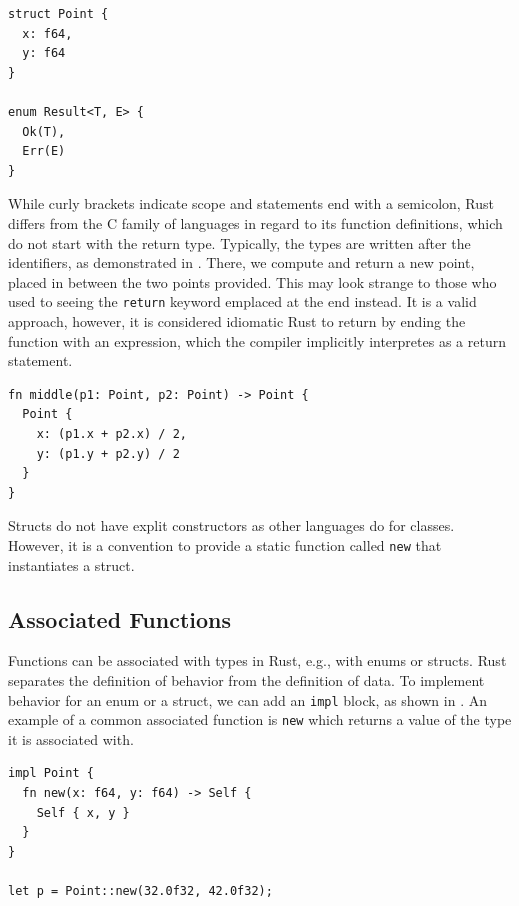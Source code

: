 \documentclass[paper=a4,%
  twoside,%
  BCOR4mm,%
  abstract=true,%
  toc=bibliography,%
  chapterprefix=true,%
  toc=bibliographynumbered,%
  open=right,%
  english,%
  pagesize=pdftex]{scrreprt}
\begin{document}
\begin{lstlisting}[style=boxed, caption={The type definition for a point in two-dimensional space and an enum definition}, label=lst:example-struct-enum]
struct Point {
  x: f64,
  y: f64
}

enum Result<T, E> {
  Ok(T),
  Err(E)
}
\end{lstlisting}

While curly brackets indicate scope and statements end with a semicolon, Rust differs from the C family of languages in regard to its function definitions, which do not start with the return type. Typically, the types are written after the identifiers, as demonstrated in . There, we compute and return a new point, placed in between the two points provided. This may look strange to those who used to seeing the \texttt{return} keyword emplaced at the end instead. It is a valid approach, however, it is considered idiomatic Rust to return by ending the function with an expression, which the compiler implicitly interpretes as a return statement.

\begin{lstlisting}[style=boxed, caption={A function to compute the point between two points in two-dimensional space}, label=lst:example-functions-struct-enum]
fn middle(p1: Point, p2: Point) -> Point {
  Point {
    x: (p1.x + p2.x) / 2,
    y: (p1.y + p2.y) / 2
  }
}
\end{lstlisting}

Structs do not have explit constructors as other languages do for classes. However, it is a convention to provide a static function called \texttt{new} that instantiates a struct.

\subsection{Associated Functions}
Functions can be associated with types in Rust, e.g., with enums or structs. Rust separates the definition of behavior from the definition of data. To implement behavior for an enum or a struct, we can add an \texttt{impl} block, as shown in . An example of a common associated function is \texttt{new} which returns a value of the type it is associated with.

\begin{lstlisting}[style=boxed, caption={Associating behavior with the \texttt{Point} data type defined in \Cref{lst:example-struct-enum}}, label=lst:example-associated-function]
impl Point {
  fn new(x: f64, y: f64) -> Self {
    Self { x, y }
  }
}

let p = Point::new(32.0f32, 42.0f32);
\end{lstlisting}
\end{document}
